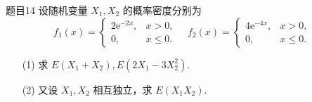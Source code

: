 \begin{question}{题目14}
    设随机变量 $X_1, X_2$ 的概率密度分别为
    $$
        f_1(x) = \begin{cases}
            2\mathrm{e}^{-2x}, & x > 0,         \\
            0,                 & x \leqslant 0.
        \end{cases}
        \quad
        f_2(x) = \begin{cases}
            4\mathrm{e}^{-4x}, & x > 0,         \\
            0,                 & x \leqslant 0.
        \end{cases}
    $$
    \begin{enumerate}
        \item[(1)] 求 $E(X_1 + X_2), E\left(2X_1 - 3X_2^2\right)$.
        \item[(2)] 又设 $X_1,X_2$ 相互独立，求 $E(X_1X_2)$.
    \end{enumerate}
\end{question}
